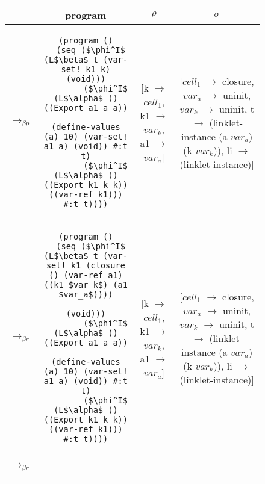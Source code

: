 \begin{figure}[h!]
  \centering
  \footnotesize
  \begin{tabular}{lc|c|c}
    &\textbf{program} & \textbf{$\rho$} & \textbf{$\sigma$} \\ \hline \hline
    $\longrightarrow_{\beta p}$&\begin{lstlisting}[mathescape]
(program ()
  (seq ($\phi^I$ (L$\beta$ t (var-set! k1 k) (void)))
        ($\phi^I$ (L$\alpha$ () ((Export a1 a a))
                (define-values (a) 10) (var-set! a1 a) (void)) #:t t)
        ($\phi^I$ (L$\alpha$ () ((Export k1 k k)) ((var-ref k1))) #:t t))))
    \end{lstlisting} & \thead{[k $\rightarrow$ $cell_1$,\\k1 $\rightarrow$ $var_k$,\\a1 $\rightarrow$ $var_a$]} & \thead{[$cell_1$ $\rightarrow$ closure,\\$var_a$ $\rightarrow$ uninit,\\$var_k$ $\rightarrow$ uninit,\\t $\rightarrow$ (linklet-instance\\(a $var_a$) (k $var_k$)),\\li $\rightarrow$ (linklet-instance)]} \\ \hline
    $\longrightarrow_{\beta r}$&\begin{lstlisting}[mathescape]
(program ()
  (seq ($\phi^I$ (L$\beta$ t (var-set! k1 (closure () (var-ref a1) ((k1 $var_k$) (a1 $var_a$))))
                       (void)))
        ($\phi^I$ (L$\alpha$ () ((Export a1 a a))
                (define-values (a) 10) (var-set! a1 a) (void)) #:t t)
        ($\phi^I$ (L$\alpha$ () ((Export k1 k k)) ((var-ref k1))) #:t t))))
    \end{lstlisting} & \thead{[k $\rightarrow$ $cell_1$,\\k1 $\rightarrow$ $var_k$,\\a1 $\rightarrow$ $var_a$]} & \thead{[$cell_1$ $\rightarrow$ closure,\\$var_a$ $\rightarrow$ uninit,\\$var_k$ $\rightarrow$ uninit,\\t $\rightarrow$ (linklet-instance\\(a $var_a$) (k $var_k$)),\\li $\rightarrow$ (linklet-instance)]} \\ \hline
    $\longrightarrow_{\beta r}$&\begin{lstlisting}[mathescape]

\end{lstlisting}
\end{tabular}
\end{figure}
